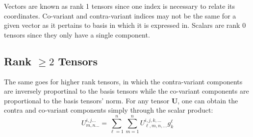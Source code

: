 Vectors are known as rank 1 tensors since one index is necessary to relate its coordinates. Co-variant and contra-variant indices may not be the same for a given vector as it pertains to basis in which it is expressed in. Scalars are rank 0 tensors since they only have a single component. \\

\subsection{Rank $\geqslant 2$ Tensors}

The same goes for higher rank tensors, in which the contra-variant components are inversely proportinal to the basis tensors while the co-variant components are proportional to the basis tensors' norm. For any tensor $\pmb{U}$, one can obtain the contra and co-variant components simply through the scalar product:\\
\begin{equation}
U^{i,j \hdots}_{m, n \hdots} = \sum_{\ell = 1}^{n} \sum_{m = 1}^{n} U^{i, j, k, \hdots}_{\ell, m, n, \hdots} g^{\ell}_{k}
\end{equation}